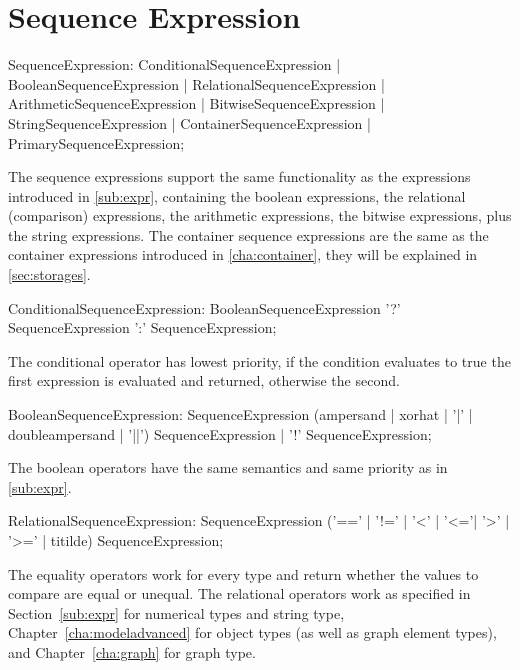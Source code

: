 \section{Sequence Expression} \label{sec:seqexpr}

\begin{rail}
  SequenceExpression:  
    ConditionalSequenceExpression |
    BooleanSequenceExpression |
    RelationalSequenceExpression |
    ArithmeticSequenceExpression |
    BitwiseSequenceExpression |
    StringSequenceExpression |
    ContainerSequenceExpression |
    PrimarySequenceExpression;
\end{rail}

The sequence expressions support the same functionality as the expressions introduced in \ref{sub:expr}, containing 
the boolean expressions,
the relational (comparison) expressions,
the arithmetic expressions,
the bitwise expressions,
plus the string expressions.
The container sequence expressions are the same as the container expressions introduced in \ref{cha:container}, they will be explained in \ref{sec:storages}.

\begin{rail}
  ConditionalSequenceExpression: 
    BooleanSequenceExpression '?' SequenceExpression ':' SequenceExpression;
\end{rail}

The conditional operator has lowest priority, if the condition evaluates to true the first expression is evaluated and returned, otherwise the second.

\begin{rail}
  BooleanSequenceExpression: 
    SequenceExpression (ampersand | xorhat | '|' | doubleampersand | '||') SequenceExpression |
    '!' SequenceExpression;
\end{rail}

The boolean operators have the same semantics and same priority as in \ref{sub:expr}.

\begin{rail}
  RelationalSequenceExpression: 
    SequenceExpression ('==' | '!=' | '<' | '<='| '>' | '>=' | titilde) SequenceExpression;
\end{rail}

The equality operators work for every type and return whether the values to compare are equal or unequal.
The relational operators work as specified in Section~\ref{sub:expr} for numerical types and string type, 
Chapter~\ref{cha:modeladvanced} for object types (as well as graph element types), and Chapter~\ref{cha:graph} for graph type.

